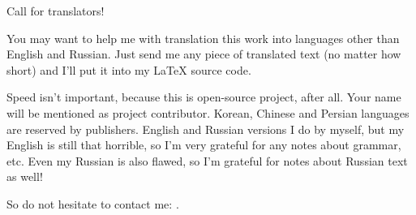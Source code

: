 \vspace*{\fill}

\Huge Call for translators!

\normalsize

\bigskip
\bigskip
\bigskip

You may want to help me with translation this work into languages other than English and Russian.
Just send me any piece of translated text (no matter how short) and I'll put it into my LaTeX source code.

\iffalse
For those who are not afraid of TeX: \href{https://github.com/dennis714/RE-for-beginners/blob/master/Translation.md}{read here}.
For those who afraid, you may just open PDF file in OpenOffice and gradually rewrite each sentence.
I'll copypaste your work back to my LaTeX source code.
There is even a better way: to my own experience, you can gain your motivation by translating short pieces of my book and posting them to your blog(s).
I can publish URLs to these your posts here and also in my twitter (\href{http://twitter.com/yurichev}{@yurichev}).
\fi

Speed isn't important, because this is open-source project, after all.
Your name will be mentioned as project contributor.
Korean, Chinese and Persian languages are reserved by publishers.
English and Russian versions I do by myself, but my English is still that horrible, so I'm very grateful for any notes about grammar, etc.
Even my Russian is also flawed, so I'm grateful for notes about Russian text as well!%

So do not hesitate to contact me: \GTT{\EMAIL}.

\vspace*{\fill}
\vfill
